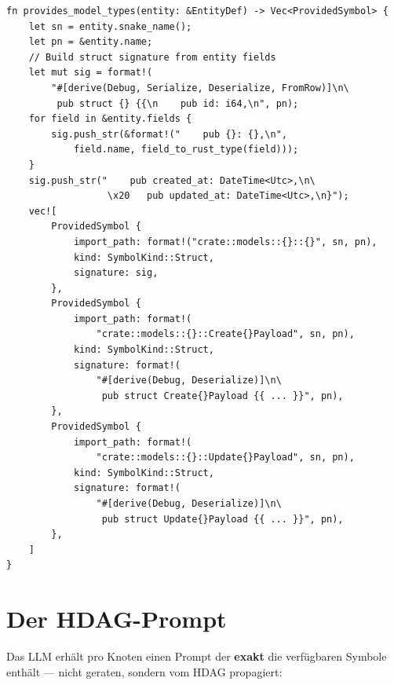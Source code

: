 \documentclass[11pt,a4paper]{article}
\begin{document}
\begin{lstlisting}
fn provides_model_types(entity: &EntityDef) -> Vec<ProvidedSymbol> {
    let sn = entity.snake_name();
    let pn = &entity.name;
    // Build struct signature from entity fields
    let mut sig = format!(
        "#[derive(Debug, Serialize, Deserialize, FromRow)]\n\
         pub struct {} {{\n    pub id: i64,\n", pn);
    for field in &entity.fields {
        sig.push_str(&format!("    pub {}: {},\n",
            field.name, field_to_rust_type(field)));
    }
    sig.push_str("    pub created_at: DateTime<Utc>,\n\
                  \x20   pub updated_at: DateTime<Utc>,\n}");
    vec![
        ProvidedSymbol {
            import_path: format!("crate::models::{}::{}", sn, pn),
            kind: SymbolKind::Struct,
            signature: sig,
        },
        ProvidedSymbol {
            import_path: format!(
                "crate::models::{}::Create{}Payload", sn, pn),
            kind: SymbolKind::Struct,
            signature: format!(
                "#[derive(Debug, Deserialize)]\n\
                 pub struct Create{}Payload {{ ... }}", pn),
        },
        ProvidedSymbol {
            import_path: format!(
                "crate::models::{}::Update{}Payload", sn, pn),
            kind: SymbolKind::Struct,
            signature: format!(
                "#[derive(Debug, Deserialize)]\n\
                 pub struct Update{}Payload {{ ... }}", pn),
        },
    ]
}
\end{lstlisting}

\section{Der HDAG-Prompt}

Das LLM erhält pro Knoten einen Prompt der \textbf{exakt} die
verfügbaren Symbole enthält --- nicht geraten, sondern vom HDAG
propagiert:
\end{document}
